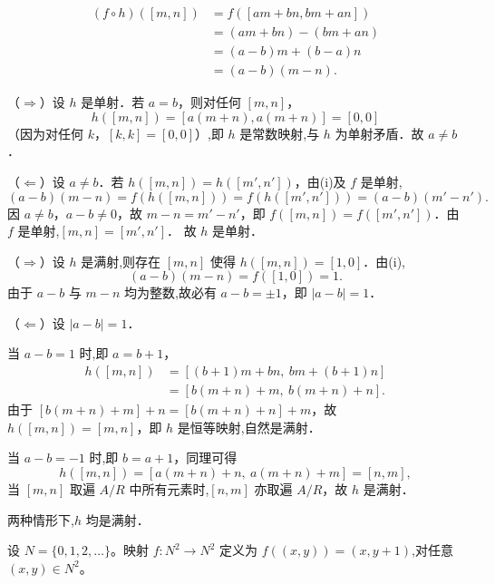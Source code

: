 \begin{questions}
\begin{parts}
\begin{solution}
\begin{align*}
(f\circ h)([m,n]) &= f\left([am+bn,bm+an]\right)\\
&= (am+bn)-(bm+an)\\
&= (a-b)m+(b-a)n\\
&= (a-b)(m-n).
\end{align*}
\end{solution}

\begin{solution}
（$\Rightarrow$）设 $h$ 是单射．若 $a=b$，则对任何 $[m,n]$，
\[
h([m,n]) = [a(m+n),a(m+n)] = [0,0]
\]
（因为对任何 $k$，$[k,k]=[0,0]$）,即 $h$ 是常数映射,与 $h$ 为单射矛盾．故 $a\neq b$．

（$\Leftarrow$）设 $a\neq b$．若 $h([m,n])=h([m',n'])$，由(i)及 $f$ 是单射,
\[
(a-b)(m-n) = f(h([m,n])) = f(h([m',n'])) = (a-b)(m'-n').
\]
因 $a\neq b$，$a-b\neq0$，故 $m-n=m'-n'$，即 $f([m,n])=f([m',n'])$．由 $f$ 是单射,$[m,n]=[m',n']$．
故 $h$ 是单射．
\end{solution}

\begin{solution}
（$\Rightarrow$）设 $h$ 是满射,则存在 $[m,n]$ 使得 $h([m,n])=[1,0]$．由(i),
\[
(a-b)(m-n) = f([1,0]) = 1.
\]
由于 $a-b$ 与 $m-n$ 均为整数,故必有 $a-b=\pm1$，即 $|a-b|=1$．

（$\Leftarrow$）设 $|a-b|=1$．

当 $a-b=1$ 时,即 $a=b+1$，
\begin{align*}
h([m,n]) &= [(b+1)m+bn,\ bm+(b+1)n]\\
&= [b(m+n)+m,\ b(m+n)+n].
\end{align*}
由于 $\left[b(m+n)+m\right]+n=\left[b(m+n)+n\right]+m$，故 $h([m,n])=[m,n]$，即 $h$ 是恒等映射,自然是满射．

当 $a-b=-1$ 时,即 $b=a+1$，同理可得
\[
h([m,n]) = [a(m+n)+n,\ a(m+n)+m] = [n,m],
\]
当 $[m,n]$ 取遍 $A/R$ 中所有元素时,$[n,m]$ 亦取遍 $A/R$，故 $h$ 是满射．

两种情形下,$h$ 均是满射．
\end{solution}

\end{parts}

\question

设 $N=\{0,1,2,\ldots\}$。映射 $f:N^2\to N^2$ 定义为 $f((x,y))=(x,y+1)$,对任意 $(x,y)\in N^2$。

\end{questions}
